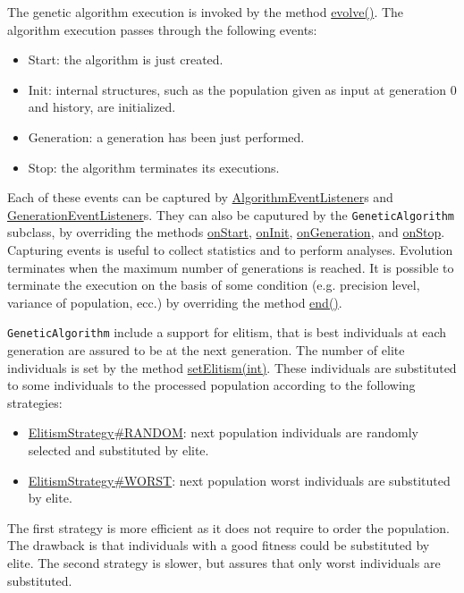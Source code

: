 The genetic algorithm execution is invoked by the method \hyperlink{classjenes_1_1_genetic_algorithm_3_01_t_01extends_01_chromosome_01_4_8afdd855dc891b981cbf675c63db72c3}{evolve()}. The algorithm execution passes through the following events: \begin{itemize}
\item Start: the algorithm is just created. \item Init: internal structures, such as the population given as input at generation 0 and history, are initialized. \item Generation: a generation has been just performed. \item Stop: the algorithm terminates its executions. \end{itemize}
Each of these events can be captured by \hyperlink{}{AlgorithmEventListener}s and \hyperlink{}{GenerationEventListener}s. They can also be caputured by the {\tt GeneticAlgorithm} subclass, by overriding the methods \hyperlink{classjenes_1_1_genetic_algorithm_3_01_t_01extends_01_chromosome_01_4_0ed4a97cf7e3266913eaad8092913de3}{onStart}, \hyperlink{classjenes_1_1_genetic_algorithm_3_01_t_01extends_01_chromosome_01_4_85479397ce0f8bd995b97fa91f4d6690}{onInit}, \hyperlink{classjenes_1_1_genetic_algorithm_3_01_t_01extends_01_chromosome_01_4_ed0d630f1e0b290bb87ba9ab8b164b89}{onGeneration}, and \hyperlink{classjenes_1_1_genetic_algorithm_3_01_t_01extends_01_chromosome_01_4_04258af6f64ec98561b015651d20f9ea}{onStop}. Capturing events is useful to collect statistics and to perform analyses. Evolution terminates when the maximum number of generations is reached. It is possible to terminate the execution on the basis of some condition (e.g. precision level, variance of population, ecc.) by overriding the method \hyperlink{classjenes_1_1_genetic_algorithm_3_01_t_01extends_01_chromosome_01_4_41376d72c82d4503693eebb3832cf772}{end()}. 

{\tt GeneticAlgorithm} include a support for elitism, that is best individuals at each generation are assured to be at the next generation. The number of elite individuals is set by the method \hyperlink{}{setElitism(int)}. These individuals are substituted to some individuals to the processed population according to the following strategies: \begin{itemize}
\item \hyperlink{}{ElitismStrategy\#RANDOM}: next population individuals are randomly selected and substituted by elite. \item \hyperlink{}{ElitismStrategy\#WORST}: next population worst individuals are substituted by elite. \end{itemize}
The first strategy is more efficient as it does not require to order the population. The drawback is that individuals with a good fitness could be substituted by elite. The second strategy is slower, but assures that only worst individuals are substituted. 

